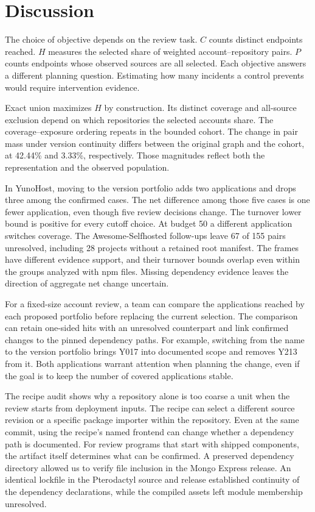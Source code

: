 \section{Discussion}
\label{sec:discussion}
The choice of objective depends on the review task. $C$ counts distinct endpoints reached. $H$ measures the selected share of weighted account--repository pairs. $P$ counts endpoints whose observed sources are all selected. Each objective answers a different planning question. Estimating how many incidents a control prevents would require intervention evidence.

Exact union maximizes $H$ by construction. Its distinct coverage and all-source exclusion depend on which repositories the selected accounts share. The coverage--exposure ordering repeats in the bounded cohort. The change in pair mass under version continuity differs between the original graph and the cohort, at 42.44\% and 3.33\%, respectively. Those magnitudes reflect both the representation and the observed population.

In YunoHost, moving to the version portfolio adds two applications and drops three among the confirmed cases. The net difference among those five cases is one fewer application, even though five review decisions change. The turnover lower bound is positive for every cutoff choice. At budget 50 a different application switches coverage. The Awesome-Selfhosted follow-ups leave 67 of 155 pairs unresolved, including 28 projects without a retained root manifest. The frames have different evidence support, and their turnover bounds overlap even within the groups analyzed with npm files. Missing dependency evidence leaves the direction of aggregate net change uncertain.

For a fixed-size account review, a team can compare the applications reached by each proposed portfolio before replacing the current selection. The comparison can retain one-sided hits with an unresolved counterpart and link confirmed changes to the pinned dependency paths. For example, switching from the name to the version portfolio brings Y017 into documented scope and removes Y213 from it. Both applications warrant attention when planning the change, even if the goal is to keep the number of covered applications stable.

The recipe audit shows why a repository alone is too coarse a unit when the review starts from deployment inputs. The recipe can select a different source revision or a specific package importer within the repository. Even at the same commit, using the recipe's named frontend can change whether a dependency path is documented. For review programs that start with shipped components, the artifact itself determines what can be confirmed. A preserved dependency directory allowed us to verify file inclusion in the Mongo Express release. An identical lockfile in the Pterodactyl source and release established continuity of the dependency declarations, while the compiled assets left module membership unresolved.

